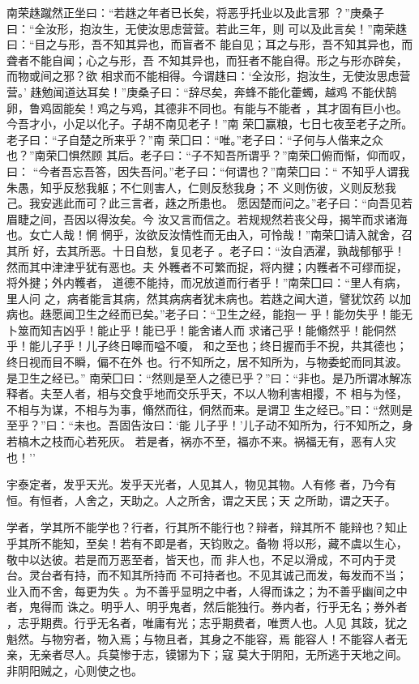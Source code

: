\documentclass[]{article}
\begin{document}
南荣趎蹴然正坐曰：``若趎之年者已长矣，将恶乎托业以及此言邪
？''庚桑子曰：``全汝形，抱汝生，无使汝思虑营营。若此三年，则
可以及此言矣！''南荣趎曰：``目之与形，吾不知其异也，而盲者不
能自见；耳之与形，吾不知其异也，而聋者不能自闻；心之与形，吾
不知其异也，而狂者不能自得。形之与形亦辟矣，而物或间之邪？欲
相求而不能相得。今谓趎曰：`全汝形，抱汝生，无使汝思虑营营。'
趎勉闻道达耳矣！''庚桑子曰：``辞尽矣，奔蜂不能化藿蠋，越鸡
不能伏鹄卵，鲁鸡固能矣！鸡之与鸡，其德非不同也。有能与不能者
，其才固有巨小也。今吾才小，小足以化子。子胡不南见老子！''南
荣囗赢粮，七日七夜至老子之所。老子曰：``子自楚之所来乎？''南
荣囗曰：``唯。''老子曰：``子何与人偕来之众也？''南荣囗惧然顾
其后。老子曰：``子不知吾所谓乎？''南荣囗俯而惭，仰而叹，曰：
``今者吾忘吾答，因失吾问。''老子曰：``何谓也？''南荣囗曰：``
不知乎人谓我朱愚，知乎反愁我躯；不仁则害人，仁则反愁我身；不
义则伤彼，义则反愁我己。我安逃此而可？此三言者，趎之所患也。
愿因楚而问之。''老子曰：``向吾见若眉睫之间，吾因以得汝矣。今
汝又言而信之。若规规然若丧父母，揭竿而求诸海也。女亡人哉！惘
惘乎，汝欲反汝情性而无由入，可怜哉！''南荣囗请入就舍，召其所
好，去其所恶。十日自愁，复见老子
。老子曰：``汝自洒濯，孰哉郁郁乎！然而其中津津乎犹有恶也。夫
外韄者不可繁而捉，将内揵；内韄者不可缪而捉，将外揵；外内韄者，
道德不能持，而况放道而行者乎！''南荣囗曰：``里人有病，里人问
之，病者能言其病，然其病病者犹未病也。若趎之闻大道，譬犹饮药
以加病也。趎愿闻卫生之经而已矣。''老子曰：``卫生之经，能抱一
乎！能勿失乎！能无卜筮而知吉凶乎！能止乎！能已乎！能舍诸人而
求诸己乎！能翛然乎！能侗然乎！能儿子乎！儿子终日嗥而嗌不嗄，
和之至也；终日握而手不掜，共其德也；终日视而目不瞬，偏不在外
也。行不知所之，居不知所为，与物委蛇而同其波。是卫生之经已。''
南荣囗曰：``然则是至人之德已乎？''曰：``非也。是乃所谓冰解冻
释者。夫至人者，相与交食乎地而交乐乎天，不以人物利害相撄，不
相与为怪，不相与为谋，不相与为事，翛然而往，侗然而来。是谓卫
生之经已。''曰：``然则是至乎？''曰：``未也。吾固告汝曰：`能
儿子乎！'儿子动不知所为，行不知所之，身若槁木之枝而心若死灰。
若是者，祸亦不至，福亦不来。祸福无有，恶有人灾也！''

宇泰定者，发乎天光。发乎天光者，人见其人，物见其物。人有修
者，乃今有恒。有恒者，人舍之，天助之。人之所舍，谓之天民；天
之所助，谓之天子。

学者，学其所不能学也？行者，行其所不能行也？辩者，辩其所不
能辩也？知止乎其所不能知，至矣！若有不即是者，天钧败之。备物
将以形，藏不虞以生心，敬中以达彼。若是而万恶至者，皆天也，而
非人也，不足以滑成，不可内于灵台。灵台者有持，而不知其所持而
不可持者也。不见其诚己而发，每发而不当；业入而不舍，每更为失
。为不善乎显明之中者，人得而诛之；为不善乎幽间之中者，鬼得而
诛之。明乎人、明乎鬼者，然后能独行。券内者，行乎无名；券外者
，志乎期费。行乎无名者，唯庸有光；志乎期费者，唯贾人也。人见
其跂，犹之魁然。与物穷者，物入焉；与物且者，其身之不能容，焉
能容人！不能容人者无亲，无亲者尽人。兵莫惨于志，镆铘为下；寇
莫大于阴阳，无所逃于天地之间。非阴阳贼之，心则使之也。
\end{document}
